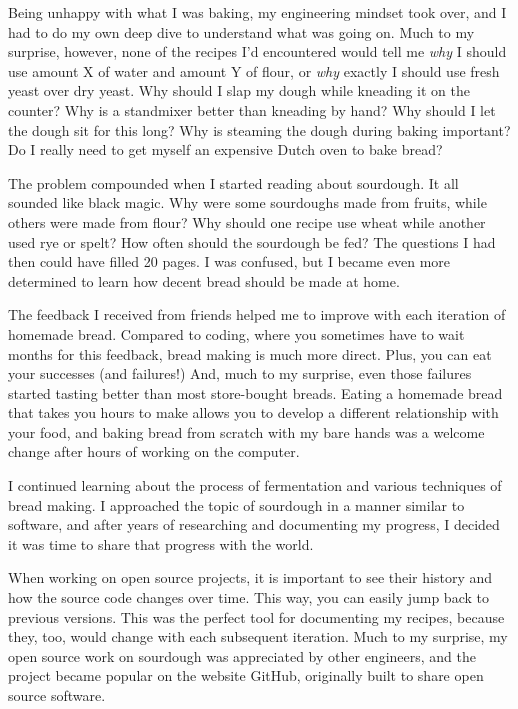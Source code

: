 Being unhappy with what I was baking, my engineering mindset took over, and I had
to do my own deep dive to understand what was going on. Much to my surprise, however,
none of the recipes I'd encountered would tell me {\it why} I should use amount X
of water and amount Y of flour, or {\it why} exactly I should use fresh yeast over dry yeast. Why
should I slap my dough while kneading it on the counter? Why is a standmixer
better than kneading by hand?  Why should I let the dough sit for this long?
Why is steaming the dough during baking important? Do I really need to
get myself an expensive Dutch oven to bake bread?

The problem compounded when I started reading about sourdough. It all sounded like black
magic. Why were some sourdoughs made from fruits, while others were made from flour?
Why should one recipe use wheat while another used rye or spelt? How often should the
sourdough be fed? The questions I had then could have filled 20 pages. I was confused,
but I became even more determined to learn how decent bread should be made at home.

The feedback I received from friends helped me to improve with each
iteration of homemade bread. Compared to coding, where you sometimes have to wait months
for this feedback, bread making is much more direct. Plus, you can eat your successes
(and failures!) And, much to my surprise, even those failures started tasting better than
most store-bought breads. Eating a homemade bread that takes you hours to make allows you
to develop a different relationship with your food, and baking bread from scratch with my
bare hands was a welcome change after hours of working on the computer.

I continued learning about the process of fermentation and various techniques of bread making.
I approached the topic of sourdough in a manner similar to software, and after years of
researching and documenting my progress, I decided it was time to share that progress with the
world.

When working on open source projects, it is important to see their history and how the source
code changes over time. This way, you can easily jump back to previous versions. This was
the perfect tool for documenting my recipes, because they, too, would change with each
subsequent iteration. Much to my surprise, my open source work on sourdough was appreciated
by other engineers, and the project became popular on the website GitHub, originally built to
share open source software.

